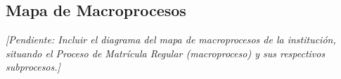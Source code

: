\subsection{Mapa de Macroprocesos}

\textit{[Pendiente: Incluir el diagrama del mapa de macroprocesos de la institución, situando el Proceso de Matrícula Regular (macroproceso) y sus respectivos subprocesos.]}


